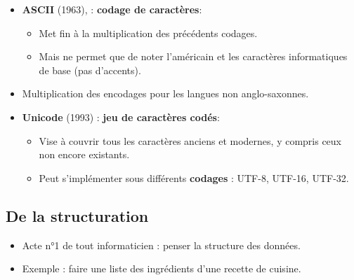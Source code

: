 \begin{slide}
	\begin{itemize}
		\item \textbf{ASCII} (1963),  : \textbf{codage de caractères}:
			\begin{itemize}
				\item Met fin à la multiplication des précédents codages.
				\item Mais ne permet que de noter l'américain et les caractères informatiques de base (pas d'accents).
			\end{itemize}
		\item Multiplication des encodages pour les langues non anglo-saxonnes.
		\item \textbf{Unicode} (1993) : \textbf{jeu de caractères codés}:
			\begin{itemize}
				\item Vise à couvrir tous les caractères anciens et modernes, y compris ceux non encore existants.
				\item Peut s'implémenter sous différents \textbf{codages} : UTF-8, UTF-16, UTF-32.
			\end{itemize}
	\end{itemize}
\end{slide}

\subsection{De la structuration}
\begin{slide}
	\begin{itemize}
		\item Acte n°1 de tout informaticien : penser la structure des données.
		\item Exemple : faire une liste des ingrédients d'une recette de cuisine.
	\end{itemize}
\end{slide}

